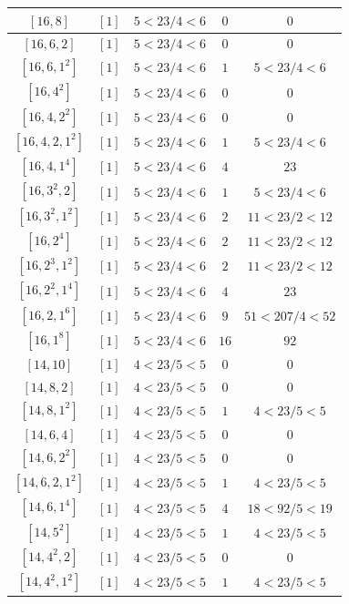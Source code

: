 \documentclass{article}%
\begin{document}
\begin{center}
\begin{longtable}{||c|c|c|c|c||}
$[16, 8]$ & $[1]$ & $5 < 23/4 < 6$ & $0$ & $0$ \\ \hline 
$[16, 6, 2]$ & $[1]$ & $5 < 23/4 < 6$ & $0$ & $0$ \\ \hline 
$[16, 6, 1^{2}]$ & $[1]$ & $5 < 23/4 < 6$ & $1$ & $5 < 23/4 < 6$ \\ \hline 
$[16, 4^{2}]$ & $[1]$ & $5 < 23/4 < 6$ & $0$ & $0$ \\ \hline 
$[16, 4, 2^{2}]$ & $[1]$ & $5 < 23/4 < 6$ & $0$ & $0$ \\ \hline 
$[16, 4, 2, 1^{2}]$ & $[1]$ & $5 < 23/4 < 6$ & $1$ & $5 < 23/4 < 6$ \\ \hline 
$[16, 4, 1^{4}]$ & $[1]$ & $5 < 23/4 < 6$ & $4$ & $23$ \\ \hline 
$[16, 3^{2}, 2]$ & $[1]$ & $5 < 23/4 < 6$ & $1$ & $5 < 23/4 < 6$ \\ \hline 
$[16, 3^{2}, 1^{2}]$ & $[1]$ & $5 < 23/4 < 6$ & $2$ & $11 < 23/2 < 12$ \\ \hline 
$[16, 2^{4}]$ & $[1]$ & $5 < 23/4 < 6$ & $2$ & $11 < 23/2 < 12$ \\ \hline 
$[16, 2^{3}, 1^{2}]$ & $[1]$ & $5 < 23/4 < 6$ & $2$ & $11 < 23/2 < 12$ \\ \hline 
$[16, 2^{2}, 1^{4}]$ & $[1]$ & $5 < 23/4 < 6$ & $4$ & $23$ \\ \hline 
$[16, 2, 1^{6}]$ & $[1]$ & $5 < 23/4 < 6$ & $9$ & $51 < 207/4 < 52$ \\ \hline 
$[16, 1^{8}]$ & $[1]$ & $5 < 23/4 < 6$ & $16$ & $92$ \\ \hline 
$[14, 10]$ & $[1]$ & $4 < 23/5 < 5$ & $0$ & $0$ \\ \hline 
$[14, 8, 2]$ & $[1]$ & $4 < 23/5 < 5$ & $0$ & $0$ \\ \hline 
$[14, 8, 1^{2}]$ & $[1]$ & $4 < 23/5 < 5$ & $1$ & $4 < 23/5 < 5$ \\ \hline 
$[14, 6, 4]$ & $[1]$ & $4 < 23/5 < 5$ & $0$ & $0$ \\ \hline 
$[14, 6, 2^{2}]$ & $[1]$ & $4 < 23/5 < 5$ & $0$ & $0$ \\ \hline 
$[14, 6, 2, 1^{2}]$ & $[1]$ & $4 < 23/5 < 5$ & $1$ & $4 < 23/5 < 5$ \\ \hline 
$[14, 6, 1^{4}]$ & $[1]$ & $4 < 23/5 < 5$ & $4$ & $18 < 92/5 < 19$ \\ \hline 
$[14, 5^{2}]$ & $[1]$ & $4 < 23/5 < 5$ & $1$ & $4 < 23/5 < 5$ \\ \hline 
$[14, 4^{2}, 2]$ & $[1]$ & $4 < 23/5 < 5$ & $0$ & $0$ \\ \hline 
$[14, 4^{2}, 1^{2}]$ & $[1]$ & $4 < 23/5 < 5$ & $1$ & $4 < 23/5 < 5$ \\ \hline 

\end{longtable}
\end{center}
\end{document}
